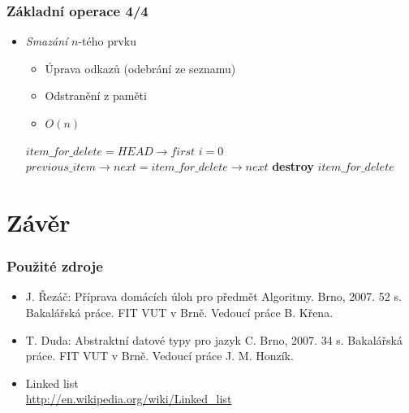 \documentclass[10pt,xcolor=pdflatex,hyperref={unicode}]{beamer}
\begin{document}
\begin{frame}[fragile]\frametitle{Základní operace 4/4}
    \begin{itemize}
        \item \emph{Smazání} $n$-tého prvku
            \begin{itemize}
                \item Úprava odkazů (odebrání ze seznamu)
                \item Odstranění z paměti
                \item $O(n)$
            \end{itemize}
        
        \begin{algorithm}[H]
            \renewcommand{\emph}[1]{\textit{#1}}
            $item\_for\_delete = HEAD \rightarrow first$\;
            $i = 0$\;
        	$previous\_item \rightarrow next = item\_for\_delete \rightarrow next$\;
        	\textbf{destroy} $item\_for\_delete$\;
        \end{algorithm}
    \end{itemize}
\end{frame}


\section{Závěr}


\begin{frame}\frametitle{Použité zdroje}
    \begin{itemize}
        \item J. Řezáč: Příprava domácích úloh pro předmět Algoritmy. Brno, 2007. 52 s. Bakalářská práce. FIT VUT v Brně. Vedoucí práce B. Křena.
        \item T. Duda: Abstraktní datové typy pro jazyk C. Brno, 2007. 34 s. Bakalářská práce. FIT VUT v Brně. Vedoucí práce J. M. Honzík.
        \item Linked list\\
        \url{http://en.wikipedia.org/wiki/Linked_list}
    \end{itemize}
\end{frame}
\end{document}
